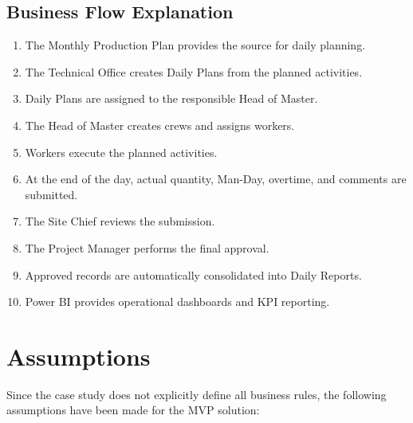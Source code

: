 \documentclass[11pt]{article}
\begin{document}
\subsection{Business Flow Explanation}

\begin{enumerate}
    \item The Monthly Production Plan provides the source for daily planning.
    \item The Technical Office creates Daily Plans from the planned activities.
    \item Daily Plans are assigned to the responsible Head of Master.
    \item The Head of Master creates crews and assigns workers.
    \item Workers execute the planned activities.
    \item At the end of the day, actual quantity, Man-Day, overtime, and comments
          are submitted.
    \item The Site Chief reviews the submission.
    \item The Project Manager performs the final approval.
    \item Approved records are automatically consolidated into Daily Reports.
    \item Power BI provides operational dashboards and KPI reporting.
\end{enumerate}

\section{Assumptions}

Since the case study does not explicitly define all business rules, the
following assumptions have been made for the MVP solution:
\end{document}
